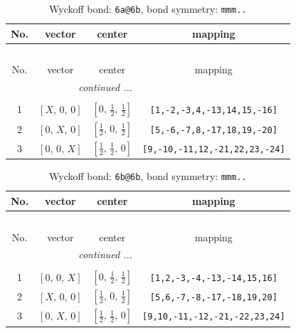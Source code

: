 \documentclass[fleqn,8pt]{jsarticle}
\begin{document}
\begin{longtable}{cccc}
\caption{Wyckoff bond: {\tt 6a@6b}, bond symmetry: {\tt mmm..}}
 \\
 \hline \hline
No. & vector & center & mapping \\ \hline \endfirsthead

\multicolumn{3}{l}{\tablename\ \thetable{}} \\
 \hline \hline
No. & vector & center & mapping \\ \hline \endhead

 \hline \hline
\multicolumn{3}{r}{\footnotesize\it continued ...} \\ \endfoot

 \hline \hline
\multicolumn{3}{r}{} \\ \endlastfoot

1 & $\left[ X,\, 0,\, 0 \right]$ & $\left[ 0,\, \frac{1}{2},\, \frac{1}{2} \right]$ & {\tt [1,-2,-3,4,-13,14,15,-16]} \\ \hline
2 & $\left[ 0,\, X,\, 0 \right]$ & $\left[ \frac{1}{2},\, 0,\, \frac{1}{2} \right]$ & {\tt [5,-6,-7,8,-17,18,19,-20]} \\ \hline
3 & $\left[ 0,\, 0,\, X \right]$ & $\left[ \frac{1}{2},\, \frac{1}{2},\, 0 \right]$ & {\tt [9,-10,-11,12,-21,22,23,-24]} \\
\end{longtable}
\renewcommand{\arraystretch}{1.2}
\begin{longtable}{cccc}
\caption{Wyckoff bond: {\tt 6b@6b}, bond symmetry: {\tt mmm..}}
 \\
 \hline \hline
No. & vector & center & mapping \\ \hline \endfirsthead

\multicolumn{3}{l}{\tablename\ \thetable{}} \\
 \hline \hline
No. & vector & center & mapping \\ \hline \endhead

 \hline \hline
\multicolumn{3}{r}{\footnotesize\it continued ...} \\ \endfoot

 \hline \hline
\multicolumn{3}{r}{} \\ \endlastfoot

1 & $\left[ 0,\, 0,\, X \right]$ & $\left[ 0,\, \frac{1}{2},\, \frac{1}{2} \right]$ & {\tt [1,2,-3,-4,-13,-14,15,16]} \\ \hline
2 & $\left[ X,\, 0,\, 0 \right]$ & $\left[ \frac{1}{2},\, 0,\, \frac{1}{2} \right]$ & {\tt [5,6,-7,-8,-17,-18,19,20]} \\ \hline
3 & $\left[ 0,\, X,\, 0 \right]$ & $\left[ \frac{1}{2},\, \frac{1}{2},\, 0 \right]$ & {\tt [9,10,-11,-12,-21,-22,23,24]} \\
\end{longtable}
\end{document}
